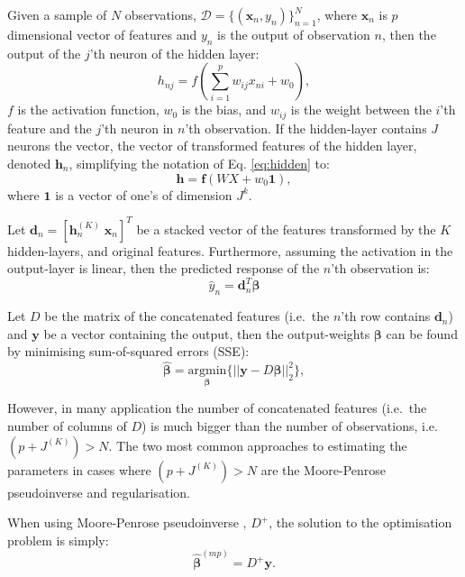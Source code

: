 \documentclass[
]{jss}
\begin{document}
Given a sample of \(N\) observations,
\(\mathcal D = \{(\boldsymbol x_n, y_n)\}_{n = 1}^N\), where
\(\boldsymbol x_n\) is \(p\) dimensional vector of features and \(y_n\)
is the output of observation \(n\), then the output of the \(j\)'th
neuron of the hidden layer: \begin{equation}
h_{nj} = f\left(\sum_{i = 1}^p w_{ij} x_{ni} + w_{0}\right), \label{eq:hidden}
\end{equation} \(f\) is the activation function, \(w_0\) is the bias,
and \(w_{ij}\) is the weight between the \(i\)'th feature and the
\(j\)'th neuron in \(n\)'th observation. If the hidden-layer contains
\(J\) neurons the vector, the vector of transformed features of the
hidden layer, denoted \(\boldsymbol h_{n}\), simplifying the notation of
Eq. \eqref{eq:hidden} to: \begin{equation}
\boldsymbol h = \boldsymbol f\left(W X + w_0 \boldsymbol{1}\right),
\end{equation} where \(\boldsymbol{1}\) is a vector of one's of
dimension \(J^{k}\).

Let \(\boldsymbol d_n = [\boldsymbol h^{(K)}_n \; \boldsymbol x_n]^T\)
be a stacked vector of the features transformed by the \(K\)
hidden-layers, and original features. Furthermore, assuming the
activation in the output-layer is linear, then the predicted response of
the \(n\)'th observation is: \begin{equation}
\hat{y}_n = \boldsymbol d^T_n \boldsymbol \beta
\end{equation}

Let \(D\) be the matrix of the concatenated features (i.e.~the \(n\)'th
row contains \(\boldsymbol d_n\)) and \(\boldsymbol y\) be a vector
containing the output, then the output-weights \(\boldsymbol \beta\) can
be found by minimising sum-of-squared errors (SSE): \begin{equation}
\hat{\boldsymbol{\beta}} = \underset{\boldsymbol{\beta}}{\text{argmin}} \Big\{ || \boldsymbol{y} - D\boldsymbol{\beta}||_2^2\Big\}, \label{eq:ssq}
\end{equation}

However, in many application the number of concatenated features
(i.e.~the number of columns of \(D\)) is much bigger than the number of
observations, i.e.~\((p + J^{(K)}) > N\). The two most common approaches
to estimating the parameters in cases where \((p + J^{(K)}) > N\) are
the Moore-Penrose pseudoinverse and regularisation.

When using Moore-Penrose pseudoinverse
\citep[\citet{PenroseInv}]{BjerhammarInv}, \(D^+\), the solution to the
optimisation problem is simply: \begin{equation}
\hat{\boldsymbol \beta}^{(mp)} = D^+ \boldsymbol y.
\end{equation}
\end{document}
